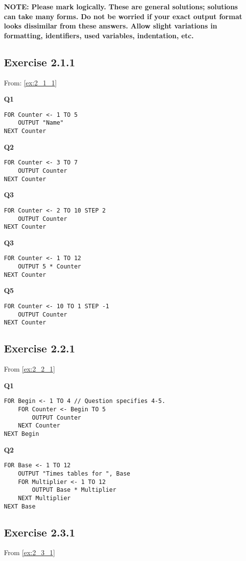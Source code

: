\documentclass[./main.tex]{subfiles}
\begin{document}
\textbf{NOTE: Please mark logically. These are general solutions; solutions can take many forms. Do not be worried if your exact output format looks dissimilar from these answers. Allow slight variations in formatting, identifiers, used variables, indentation, etc.}

\subsection*{Exercise 2.1.1}
From: \ref{ex:2_1_1}

\textbf{Q1}
\begin{verbatim}
FOR Counter <- 1 TO 5
    OUTPUT "Name"
NEXT Counter
\end{verbatim}

\textbf{Q2}
\begin{verbatim}
FOR Counter <- 3 TO 7
    OUTPUT Counter
NEXT Counter
\end{verbatim}

\textbf{Q3}
\begin{verbatim}
FOR Counter <- 2 TO 10 STEP 2
    OUTPUT Counter
NEXT Counter
\end{verbatim}

\textbf{Q3}
\begin{verbatim}
FOR Counter <- 1 TO 12
    OUTPUT 5 * Counter
NEXT Counter
\end{verbatim}

\textbf{Q5}
\begin{verbatim}
FOR Counter <- 10 TO 1 STEP -1
    OUTPUT Counter
NEXT Counter
\end{verbatim}

\newpage
\subsection*{Exercise 2.2.1}
From \ref{ex:2_2_1}

\textbf{Q1}
\begin{verbatim}
FOR Begin <- 1 TO 4 // Question specifies 4-5.
    FOR Counter <- Begin TO 5
        OUTPUT Counter
    NEXT Counter
NEXT Begin
\end{verbatim}

\textbf{Q2}
\begin{verbatim}
FOR Base <- 1 TO 12
    OUTPUT "Times tables for ", Base
    FOR Multiplier <- 1 TO 12
        OUTPUT Base * Multiplier
    NEXT Multiplier
NEXT Base
\end{verbatim}

\subsection*{Exercise 2.3.1}
From \ref{ex:2_3_1}
\end{document}
